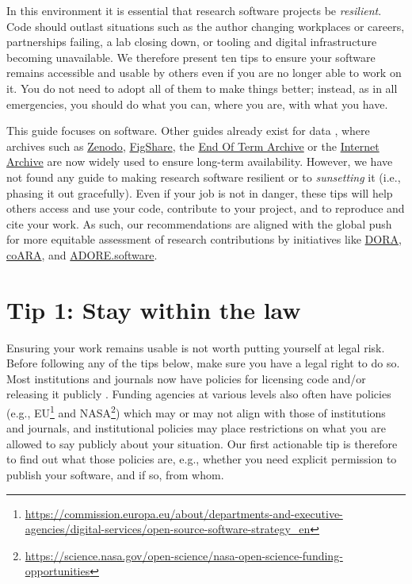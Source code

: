 \documentclass[10pt,letterpaper]{article}
\begin{document}
In this environment it is essential that research software projects be \emph{resilient}.
Code should outlast situations such as the author changing workplaces or careers,
partnerships failing,
a lab closing down,
or tooling and digital infrastructure becoming unavailable.
We therefore present ten tips to ensure your software remains accessible and usable by others
even if you are no longer able to work on it.
You do not need to adopt all of them to make things better;
instead,
as in all emergencies,
you should do what you can,
where you are,
with what you have.

This guide focuses on software.
Other guides already exist for data \cite{Perkel2023},
where archives such as \href{https://zenodo.org/}{Zenodo},
\href{https://figshare.com/}{FigShare},
the \href{https://eotarchive.org/}{End Of Term Archive}
or the \href{http://archive.org/}{Internet Archive}
are now widely used to ensure long-term availability.
However,
we have not found any guide to making research software resilient
or to \emph{sunsetting} it (i.e., phasing it out gracefully).
Even if your job is not in danger,
these tips will help others access and use your code,
contribute to your project,
and to reproduce and cite your work.
As such,
our recommendations
are aligned with the global push for more equitable assessment of research contributions
by initiatives like \href{https://sfdora.org/}{DORA},
\href{https://coara.eu/}{coARA},
and \href{https://adore.software/}{ADORE.software}.

\section*{Tip 1: Stay within the law}

Ensuring your work remains usable is not worth putting yourself at legal risk.
Before following any of the tips below,
make sure you have a legal right to do so.
Most institutions and journals now have policies for licensing code and/or releasing it publicly \cite{Katz2018,Ham2019}.
Funding agencies at various levels also often have policies
(e.g.,
EU\footnote{\url{https://commission.europa.eu/about/departments-and-executive-agencies/digital-services/open-source-software-strategy_en}}
and NASA\footnote{\url{https://science.nasa.gov/open-science/nasa-open-science-funding-opportunities}})
which may or may not align with those of institutions and journals,
and institutional policies may place restrictions on what you are allowed to say publicly about your situation.
Our first actionable tip is therefore to find out what those policies are,
e.g.,
whether you need explicit permission to publish your software,
and if so,
from whom.
\end{document}
